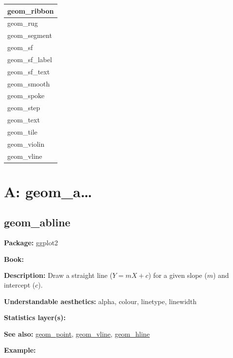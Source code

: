 \documentclass[
]{book}
\begin{document}
\begin{tabular}{l}
\hline
geom\_ribbon\\
\hline
geom\_rug\\
\hline
geom\_segment\\
\hline
geom\_sf\\
\hline
geom\_sf\_label\\
\hline
geom\_sf\_text\\
\hline
geom\_smooth\\
\hline
geom\_spoke\\
\hline
geom\_step\\
\hline
geom\_text\\
\hline
geom\_tile\\
\hline
geom\_violin\\
\hline
geom\_vline\\
\hline
\end{tabular}

\hypertarget{a-geom_a}{%
\chapter{A: geom\_a\ldots{}}\label{a-geom_a}}

\hypertarget{abline}{%
\section{geom\_abline}\label{abline}}

\textbf{Package: } ggplot2 \autocite{R-ggplot2}

\textbf{Book: }

\textbf{Description: } Draw a straight line (\(Y=mX+c\)) for a given slope (\(m\)) and intercept (\(c\)).

\textbf{Understandable aesthetics:} alpha, colour, linetype, linewidth

\textbf{Statistics layer(s):}

\textbf{See also: } \protect\hyperlink{point}{geom\_point}, \protect\hyperlink{vline}{geom\_vline}, \protect\hyperlink{hline}{geom\_hline}

\textbf{Example:}
\end{document}
